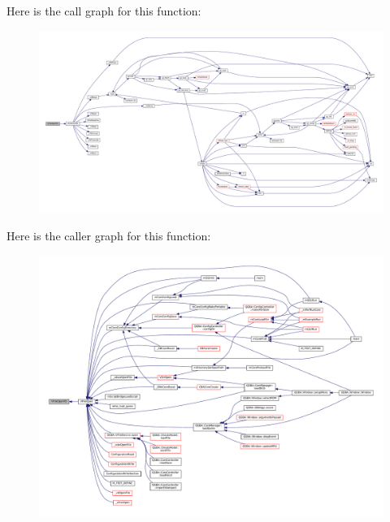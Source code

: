 Here is the call graph for this function\+:
\nopagebreak
\begin{figure}[H]
\begin{center}
\leavevmode
\includegraphics[width=350pt]{vfs-fd_8c_a016745f678d9f575dd5ba79977ba1023_cgraph}
\end{center}
\end{figure}
Here is the caller graph for this function\+:
\nopagebreak
\begin{figure}[H]
\begin{center}
\leavevmode
\includegraphics[width=350pt]{vfs-fd_8c_a016745f678d9f575dd5ba79977ba1023_icgraph}
\end{center}
\end{figure}
